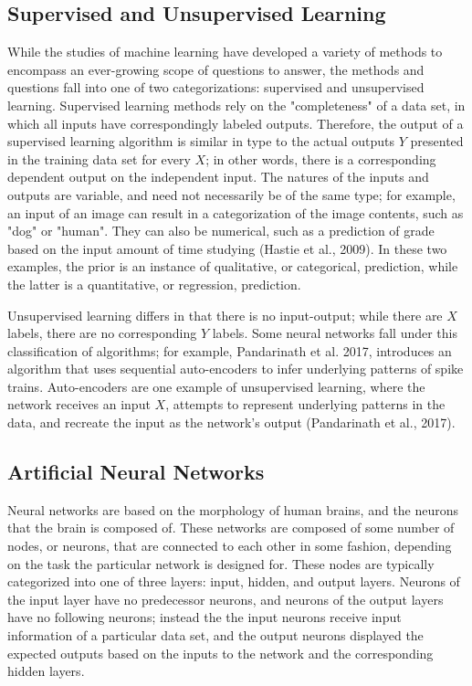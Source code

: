 \documentclass[11pt,titlepage]{article}
\begin{document}
\subsection{Supervised and Unsupervised Learning}
While the studies of machine learning have developed a variety of methods to encompass an ever-growing scope of questions to answer, the methods and questions fall into one of two categorizations: supervised and unsupervised learning. Supervised learning methods rely on the "completeness" of a data set, in which all inputs have correspondingly labeled outputs. Therefore, the output of a supervised learning algorithm is similar in type to the actual outputs $Y$ presented in the training data set for every $X$; in other words, there is a corresponding dependent output on the independent input. The natures of the inputs and outputs are variable, and need not necessarily be of the same type; for example, an input of an image can result in a categorization of the image contents, such as "dog" or "human". They can also be numerical, such as a prediction of grade based on the input amount of time studying (Hastie et al., 2009). In these two examples, the prior is an instance of qualitative, or categorical, prediction, while the latter is a quantitative, or regression, prediction.\par

Unsupervised learning differs in that there is no input-output; while there are $X$ labels, there are no corresponding $Y$ labels. Some neural networks fall under this classification of algorithms; for example, Pandarinath et al. 2017, introduces an algorithm that uses sequential auto-encoders to infer underlying patterns of spike trains. Auto-encoders are one example of unsupervised learning, where the network receives an input $X$, attempts to represent underlying patterns in the data, and recreate the input as the network's output (Pandarinath et al., 2017). 

\subsection{Artificial Neural Networks}
Neural networks are based on the morphology of human brains, and the neurons that the brain is composed of. These networks are composed of some number of nodes, or neurons, that are connected to each other in some fashion, depending on the task the particular network is designed for. These nodes are typically categorized into one of three layers: input, hidden, and output layers. Neurons of the input layer have no predecessor neurons, and neurons of the output layers have no following neurons; instead the the input neurons receive input information of a particular data set, and the output neurons displayed the expected outputs based on the inputs to the network and the corresponding hidden layers.\par
\end{document}
